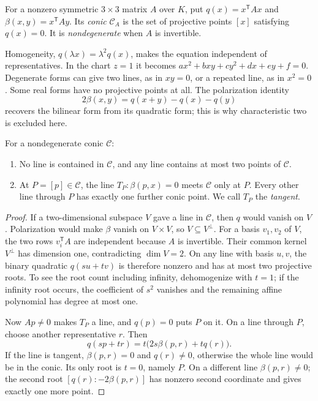 \begin{definition}\label{geometry:def:conic}
For a nonzero symmetric $3\times3$ matrix $A$ over $K$, put $q(x)=x^{\mathsf T}Ax$ and $\beta(x,y)=x^{\mathsf T}Ay$. Its \emph{conic} $\mathcal C_A$ is the set of projective points $[x]$ satisfying $q(x)=0$. It is \emph{nondegenerate} when $A$ is invertible.
\end{definition}

Homogeneity, $q(\lambda x)=\lambda^2q(x)$, makes the equation independent of representatives. In the chart $z=1$ it becomes $ax^2+bxy+cy^2+dx+ey+f=0$. Degenerate forms can give two lines, as in $xy=0$, or a repeated line, as in $x^2=0$. Some real forms have no projective points at all. The polarization identity
\[
2\beta(x,y)=q(x+y)-q(x)-q(y)
\]
recovers the bilinear form from its quadratic form; this is why characteristic two is excluded here.

\begin{proposition}\label{geometry:prop:conicline}
For a nondegenerate conic $\mathcal C$:
\begin{enumerate}
\item No line is contained in $\mathcal C$, and any line contains at most two points of $\mathcal C$.
\item At $P=[p]\in\mathcal C$, the line $T_P:\beta(p,x)=0$ meets $\mathcal C$ only at $P$. Every other line through $P$ has exactly one further conic point. We call $T_P$ the \emph{tangent}.
\end{enumerate}
\end{proposition}
\begin{proof}
If a two-dimensional subspace $V$ gave a line in $\mathcal C$, then $q$ would vanish on $V$. Polarization would make $\beta$ vanish on $V\times V$, so $V\subseteq V^\perp$. For a basis $v_1,v_2$ of $V$, the two rows $v_i^{\mathsf T}A$ are independent because $A$ is invertible. Their common kernel $V^\perp$ has dimension one, contradicting $\dim V=2$. On any line with basis $u,v$, the binary quadratic $q(su+tv)$ is therefore nonzero and has at most two projective roots. To see the root count including infinity, dehomogenize with $t=1$; if the infinity root occurs, the coefficient of $s^2$ vanishes and the remaining affine polynomial has degree at most one.

Now $Ap\ne0$ makes $T_P$ a line, and $q(p)=0$ puts $P$ on it. On a line through $P$, choose another representative $r$. Then
\[
q(sp+tr)=t\bigl(2s\beta(p,r)+tq(r)\bigr).
\]
If the line is tangent, $\beta(p,r)=0$ and $q(r)\ne0$, otherwise the whole line would be in the conic. Its only root is $t=0$, namely $P$. On a different line $\beta(p,r)\ne0$; the second root $[q(r):-2\beta(p,r)]$ has nonzero second coordinate and gives exactly one more point.
\end{proof}

